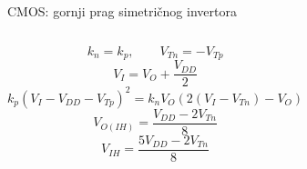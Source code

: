 \begin{frame}[label=09_2-s034]{CMOS: gornji prag simetričnog invertora}
\begin{columns}[T,onlytextwidth]\centering {}\[k_n=k_p,\qquad V_{Tn}=-V_{Tp}\]
\[V_I=V_O+\frac{V_{DD}}2\]
\[k_p(V_I-V_{DD}-V_{Tp})^2=k_nV_O\left(2(V_I-V_{Tn})-V_O\right)\]
\[V_{O(IH)}=\frac{V_{DD}-2V_{Tn}}8\]
\[V_{IH}=\frac{5V_{DD}-2V_{Tn}}8\]
\end{columns}
\end{frame}
